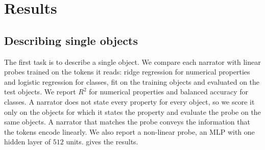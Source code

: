 \section{Results}\label{sec:results}

\subsection{Describing single objects}\label{sec:description}
The first task is to describe a single object. We compare each narrator with linear probes
trained on the tokens it reads: ridge regression for numerical properties and logistic
regression for classes, fit on the training objects and evaluated on the test objects. We
report $R^2$ for numerical properties and balanced accuracy for classes. A narrator does not
state every property for every object, so we score it only on the objects for which it states
the property and evaluate the probe on the same objects. A narrator that matches the probe
conveys the information that the tokens encode linearly. We also report a non-linear probe, an
MLP with one hidden layer of $512$ units.  gives the results.

